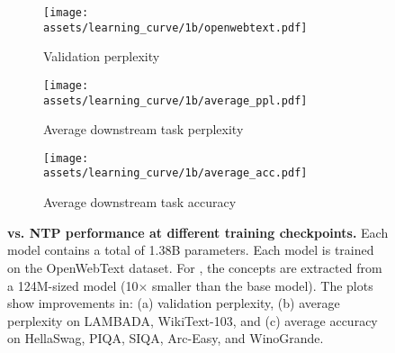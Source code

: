 \begin{figure*}[t]
\centering\small

\begin{subfigure}[b]{0.3275\textwidth}
    \centering
    \texttt{[image: assets/learning\_curve/1b/openwebtext.pdf]}
    \caption{Validation perplexity}
\end{subfigure}
\hfill
\begin{subfigure}[b]{0.3275\textwidth}
    \centering
    \texttt{[image: assets/learning\_curve/1b/average\_ppl.pdf]}
    \caption{Average downstream task perplexity}
\end{subfigure}
\hfill
\begin{subfigure}[b]{0.3275\textwidth}
    \centering
    \texttt{[image: assets/learning\_curve/1b/average\_acc.pdf]}
    \caption{Average downstream task accuracy}
\end{subfigure}
\caption{
\textbf{\sname vs. NTP performance at different training checkpoints.} Each model contains a total of 1.38B parameters. Each model is trained on the OpenWebText dataset. For \sname, the concepts are extracted from a 124M-sized model (10$\times$ smaller than the base model). The plots show improvements in: (a) validation perplexity, (b) average perplexity on LAMBADA, WikiText-103, and (c) average accuracy on HellaSwag, PIQA, SIQA, Arc-Easy, and WinoGrande.
}
\label{fig:main_curve}
\end{figure*}
